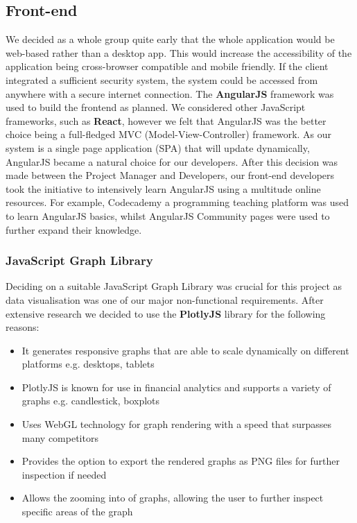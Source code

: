 \documentclass[12pt]{article}
\begin{document}
  \subsection{Front-end}
  We decided as a whole group quite early that the whole application would be web-based rather than a desktop app. This would
  increase the accessibility of the application being cross-browser compatible and mobile friendly. If the client integrated a sufficient
  security system, the system could be accessed from anywhere with a secure internet connection.\newline
  The \textbf{AngularJS} framework was used to build the frontend as planned. We considered other JavaScript frameworks,
  such as \textbf{React}, however we felt that AngularJS was the better choice being a full-fledged MVC (Model-View-Controller) framework.
  As our system is a single page application (SPA) that will update dynamically, AngularJS became a natural choice for our developers.
  \newline
  After this decision was made between the Project Manager and Developers, our front-end developers took the initiative to intensively learn AngularJS using a multitude online resources.
  For example, Codecademy a programming teaching platform was used to learn AngularJS basics, whilst AngularJS Community pages were used to further expand their knowledge.
  \subsubsection{JavaScript Graph Library}
  Deciding on a suitable JavaScript Graph Library was crucial for this project as data visualisation was one of our major non-functional requirements.
  After extensive research we decided to use the \textbf{PlotlyJS} library for the following reasons:
  \begin{itemize}
    \itemsep0em
    \item It generates responsive graphs that are able to scale dynamically on different platforms e.g. desktops, tablets
    \item PlotlyJS is known for use in financial analytics and supports a variety of graphs e.g. candlestick, boxplots
    \item Uses WebGL technology for graph rendering with a speed that surpasses many competitors
    \item Provides the option to export the rendered graphs as PNG files for further inspection if needed
    \item Allows the zooming into of graphs, allowing the user to further inspect specific areas of the graph
  \end{itemize}
\end{document}
